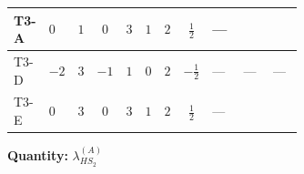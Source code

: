 \documentclass[8pt]{article}
\begin{document}
\begin{landscape}
\begin{longtable}{@{}llcccccc >{\raggedright\arraybackslash}p{0.21\linewidth} >{\raggedright\arraybackslash}p{0.21\linewidth} >{\raggedright\arraybackslash}p{0.21\linewidth}@{}}
\midrule
T3-A & $0$ & $1$ & $0$ & $3$ & $1$ & $2$ & $\frac{1}{2}$ & --- & \scriptsize\adjustbox{max width=\linewidth}{$\begin{gathered} +2 {\lambda_1} {\lambda_{HS_2}^{(A)}}\end{gathered}$} & \scriptsize\adjustbox{max width=\linewidth}{$\begin{gathered} +8 {\lambda_{HS_2}^{(1)}} {\lambda_{HS_2}^{(A)}}\end{gathered}$} \\
\midrule
T3-D & $-2$ & $3$ & $-1$ & $1$ & $0$ & $2$ & $-\frac{1}{2}$ & --- & --- & --- \\
\midrule
T3-E & $0$ & $3$ & $0$ & $3$ & $1$ & $2$ & $\frac{1}{2}$ & --- & \scriptsize\adjustbox{max width=\linewidth}{$\begin{gathered} +2 {\lambda_1} {\lambda_{HS_2}^{(A)}}\end{gathered}$} & \scriptsize\adjustbox{max width=\linewidth}{$\begin{gathered} +8 {\lambda_{HS_2}^{(1)}} {\lambda_{HS_2}^{(A)}}\end{gathered}$} \\
\midrule
\bottomrule
\end{longtable}
\clearpage
\noindent\textbf{Quantity: }$\lambda_{HS_2}^{(A)}$\par\smallskip

\end{landscape}
\end{document}
